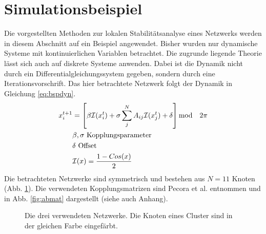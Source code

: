 \section{Simulationsbeispiel}
Die vorgestellten Methoden zur lokalen Stabilitätsanalyse eines Netzwerks werden in diesem Abschnitt auf ein Beispiel angewendet. Bisher wurden nur dynamische Systeme mit kontinuierlichen Variablen betrachtet. Die zugrunde liegende Theorie lässt sich auch auf diskrete Systeme anwenden. Dabei ist die Dynamik nicht durch ein Differentialgleichungssystem gegeben, sondern durch eine Iterationsvorschrift. Das hier betrachtete Netzwerk \cite{pecora2014} folgt der Dynamik in Gleichung \ref{eq:bspdyn}.
\begin{align}
\label{eq:bspdyn}
	x_i^{t+1}&=\left[\beta\mathcal{I}(x_i^t)+\sigma \sum_j^N A_{ij}\mathcal{I}(x_j^t)+\delta\right] \text{mod}\quad 2\pi
	\\\notag & \beta,\sigma \text{ Kopplungsparameter}
	\\\notag  & \delta \text{ Offset}
	\\\notag &\mathcal{I}(x)=\frac{1-Cos(x)}{2}
\end{align}
Die betrachteten Netzwerke sind symmetrisch und bestehen aus $N=11$ Knoten  (Abb. \ref{fig:cluster}). Die verwendeten Kopplungsmatrizen sind Pecora et al. \cite{pecora2014} entnommen und in Abb. \ref{fig:abmat} dargestellt (siehe auch Anhang). 
\begin{figure}
	 \centering
	 \caption[In der Simulation verwendete Netzwerke]{Die drei verwendeten Netzwerke. Die Knoten eines Cluster sind in der gleichen Farbe eingefärbt.}
	 \label{fig:cluster}
\end{figure}

